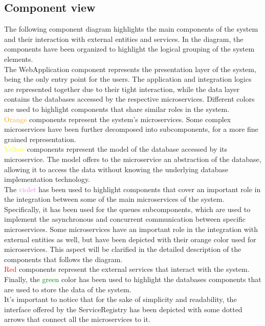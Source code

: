 \subsection{Component view}
The following component diagram highlights the main components of the system and their interaction with external entities and services. In the diagram, the components have 
been organized to highlight the logical grouping of the system elements.\\The WebApplication component represents the presentation layer of the system, being the only entry point for the users.
The application and integration logics are represented together due to their tight interaction, while the data layer contains the databases accessed by the respective microservices.
Different colors are used to highlight components that share similar roles in the system.\\ \textcolor{orange}{Orange} components represent the system's microservices. Some complex microservices have been further decomposed into subcomponents, for a more fine grained representation.\\
\textcolor{yellow}{Yellow} components represent the model of the database accessed by its microservice. The model offers to the microservice an abstraction of the database, allowing it to access the data without knowing the underlying database implementation technology.\\ 
The \textcolor{violet}{violet} has been used to highlight components that cover an important role in the integration between some of the main microservices of the system. Specifically, it has been used for the queues subcomponents, which are used to implement the asynchronous and concurrent communication between specific microservices.
Some microservices have an important role in the integration with external entities as well, but have been depicted with their orange color used for microservices. This aspect will be clarified in the detailed description of the components that follows the diagram.\\
\textcolor{red}{Red} components represent the external services that interact with the system.\\
Finally, the \textcolor{green}{green} color has been used to highlight the databases components that are used to store the data of the system.\\
It's important to notice that for the sake of simplicity and readability, the interface offered by the ServiceRegistry has been depicted with some dotted arrows that connect all the microservices to it.
